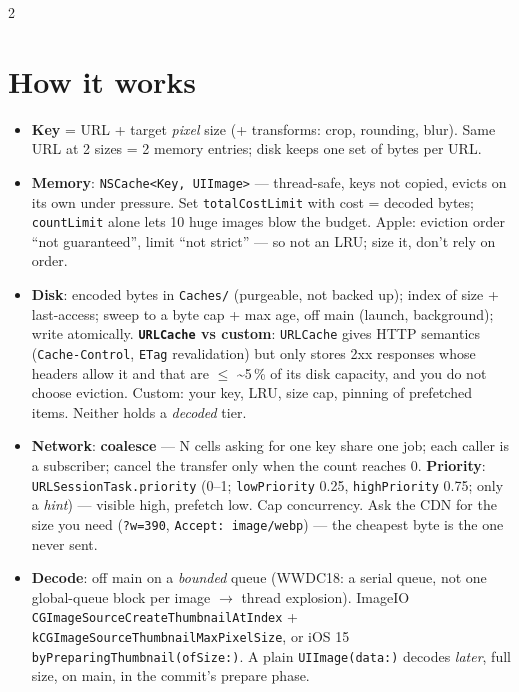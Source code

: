 \documentclass[8pt]{extarticle}
\newcommand\ct[1]{\texttt{#1}}
\begin{document}
\begin{multicols}{2}
\small\raggedright

\section{How it works}
\begin{itemize}
  \item \textbf{Key} = URL + target \emph{pixel} size (+ transforms: crop, rounding, blur). Same
        URL at 2 sizes = 2 memory entries; disk keeps one set of bytes per URL.
  \item \textbf{Memory}: \ct{NSCache<Key, UIImage>} — thread-safe, keys not copied, evicts
        on its own under pressure. Set \ct{totalCostLimit} with cost = decoded bytes;
        \ct{countLimit} alone lets 10 huge images blow the budget. Apple: eviction order ``not
        guaranteed'', limit ``not strict'' — so not an LRU; size it, don't rely on order.
  \item \textbf{Disk}: encoded bytes in \ct{Caches/} (purgeable, not backed up); index of
        size + last-access; sweep to a byte cap + max age, off main (launch, background); write
        atomically. \textbf{\ct{URLCache} vs custom}: \ct{URLCache} gives HTTP semantics
        (\ct{Cache-Control}, \ct{ETag} revalidation) but only stores 2xx responses whose
        headers allow it and that are $\leq$ \textasciitilde5\,\% of its disk capacity, and you
        do not choose eviction. Custom: your key, LRU, size cap, pinning of prefetched
        items. Neither holds a \emph{decoded} tier.
  \item \textbf{Network}: \textbf{coalesce} — N cells asking for one key share one job;
        each caller is a subscriber; cancel the transfer only when the count reaches 0.
        \textbf{Priority}: \ct{URLSessionTask.priority} (0–1; \ct{lowPriority} 0.25,
        \ct{highPriority} 0.75; only a \emph{hint}) — visible high, prefetch low. Cap concurrency. Ask the CDN
        for the size you need (\ct{?w=390}, \ct{Accept: image/webp}) — the cheapest byte is
        the one never sent.
  \item \textbf{Decode}: off main on a \emph{bounded} queue (WWDC18: a serial queue, not
        one global-queue block per image $\to$ thread explosion). ImageIO
        \ct{CGImageSourceCreateThumbnailAtIndex} + \ct{kCGImageSourceThumbnailMaxPixelSize},
        or iOS 15 \ct{byPreparingThumbnail(ofSize:)}. A plain \ct{UIImage(data:)} decodes
        \emph{later}, full size, on main, in the commit's prepare phase.

\end{itemize}
\end{multicols}
\end{document}
